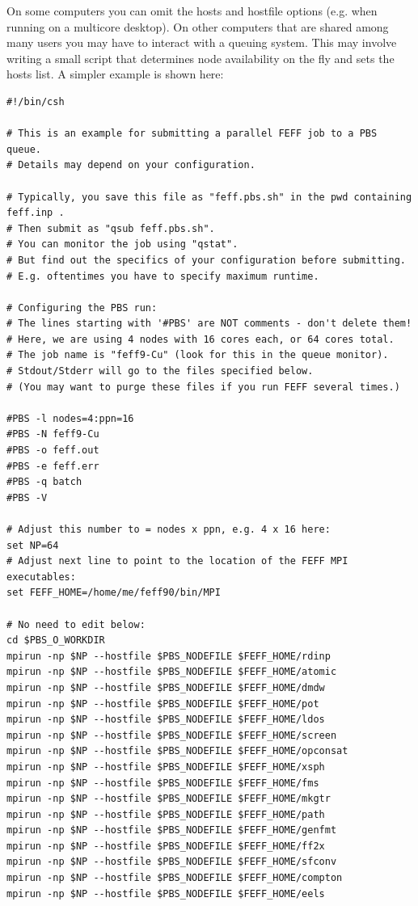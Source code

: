 \documentclass[11pt,oneside]{report} %
\begin{document}
On some computers you can omit the hosts and hostfile options (e.g. when running on a multicore desktop).  On other computers that are shared among many users you may have to interact with a queuing system.  This may involve writing a small script that determines node availability on the fly and sets the hosts list.  A simpler example is shown here:

\begin{verbatim}
#!/bin/csh

# This is an example for submitting a parallel FEFF job to a PBS queue.
# Details may depend on your configuration.

# Typically, you save this file as "feff.pbs.sh" in the pwd containing feff.inp .
# Then submit as "qsub feff.pbs.sh".
# You can monitor the job using "qstat".
# But find out the specifics of your configuration before submitting.
# E.g. oftentimes you have to specify maximum runtime.

# Configuring the PBS run:
# The lines starting with '#PBS' are NOT comments - don't delete them!
# Here, we are using 4 nodes with 16 cores each, or 64 cores total.
# The job name is "feff9-Cu" (look for this in the queue monitor).
# Stdout/Stderr will go to the files specified below.
# (You may want to purge these files if you run FEFF several times.)

#PBS -l nodes=4:ppn=16
#PBS -N feff9-Cu
#PBS -o feff.out
#PBS -e feff.err
#PBS -q batch
#PBS -V

# Adjust this number to = nodes x ppn, e.g. 4 x 16 here:
set NP=64
# Adjust next line to point to the location of the FEFF MPI executables: 
set FEFF_HOME=/home/me/feff90/bin/MPI

# No need to edit below:
cd $PBS_O_WORKDIR
mpirun -np $NP --hostfile $PBS_NODEFILE $FEFF_HOME/rdinp 
mpirun -np $NP --hostfile $PBS_NODEFILE $FEFF_HOME/atomic 
mpirun -np $NP --hostfile $PBS_NODEFILE $FEFF_HOME/dmdw 
mpirun -np $NP --hostfile $PBS_NODEFILE $FEFF_HOME/pot  
mpirun -np $NP --hostfile $PBS_NODEFILE $FEFF_HOME/ldos  
mpirun -np $NP --hostfile $PBS_NODEFILE $FEFF_HOME/screen 
mpirun -np $NP --hostfile $PBS_NODEFILE $FEFF_HOME/opconsat 
mpirun -np $NP --hostfile $PBS_NODEFILE $FEFF_HOME/xsph 
mpirun -np $NP --hostfile $PBS_NODEFILE $FEFF_HOME/fms   
mpirun -np $NP --hostfile $PBS_NODEFILE $FEFF_HOME/mkgtr 
mpirun -np $NP --hostfile $PBS_NODEFILE $FEFF_HOME/path  
mpirun -np $NP --hostfile $PBS_NODEFILE $FEFF_HOME/genfmt 
mpirun -np $NP --hostfile $PBS_NODEFILE $FEFF_HOME/ff2x  
mpirun -np $NP --hostfile $PBS_NODEFILE $FEFF_HOME/sfconv 
mpirun -np $NP --hostfile $PBS_NODEFILE $FEFF_HOME/compton 
mpirun -np $NP --hostfile $PBS_NODEFILE $FEFF_HOME/eels 
\end{verbatim}
\end{document}
